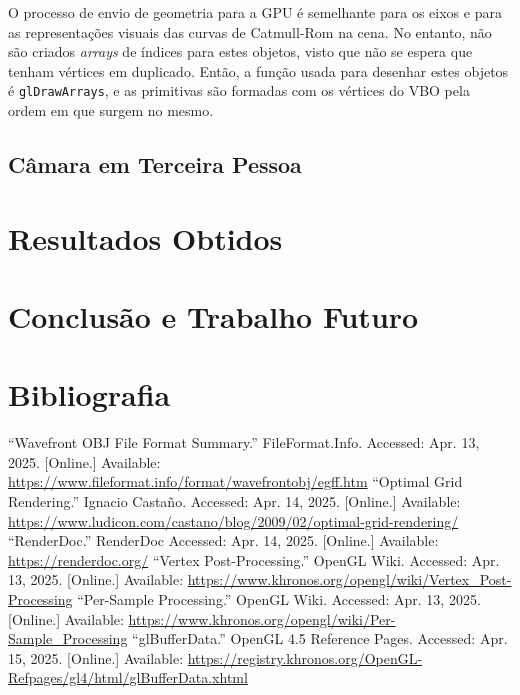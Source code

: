\documentclass[12pt, a4paper]{article}
\begin{document}
O processo de envio de geometria para a GPU é semelhante para os eixos e para as representações
visuais das curvas de Catmull-Rom na cena. No entanto, não são criados \emph{arrays} de índices para
estes objetos, visto que não se espera que tenham vértices em duplicado. Então, a função usada para
desenhar estes objetos é \texttt{glDrawArrays}, e as primitivas são formadas com os vértices do VBO
pela ordem em que surgem no mesmo.

\subsection{Câmara em Terceira Pessoa}

\section{Resultados Obtidos}

\section{Conclusão e Trabalho Futuro}

\begingroup
\section{Bibliografia}
\renewcommand{\section}[2]{}

\begin{thebibliography}{9}
        ``Wavefront OBJ File Format Summary.'' FileFormat.Info. Accessed: Apr. 13, 2025. [Online.]
        Available: \url{https://www.fileformat.info/format/wavefrontobj/egff.htm}
        ``Optimal Grid Rendering.'' Ignacio Castaño. Accessed: Apr. 14, 2025. [Online.] Available:
        \url{https://www.ludicon.com/castano/blog/2009/02/optimal-grid-rendering/}
        ``RenderDoc.'' RenderDoc Accessed: Apr. 14, 2025. [Online.] Available:
        \url{https://renderdoc.org/}
        ``Vertex Post-Processing.'' OpenGL Wiki. Accessed: Apr. 13, 2025. [Online.] Available:
        \url{https://www.khronos.org/opengl/wiki/Vertex_Post-Processing}
        ``Per-Sample Processing.'' OpenGL Wiki. Accessed: Apr. 13, 2025. [Online.] Available:
        \url{https://www.khronos.org/opengl/wiki/Per-Sample_Processing}
        ``glBufferData.'' OpenGL 4.5 Reference Pages. Accessed: Apr. 15, 2025. [Online.] Available:
        \url{https://registry.khronos.org/OpenGL-Refpages/gl4/html/glBufferData.xhtml}
\end{thebibliography}
\endgroup
\end{document}
